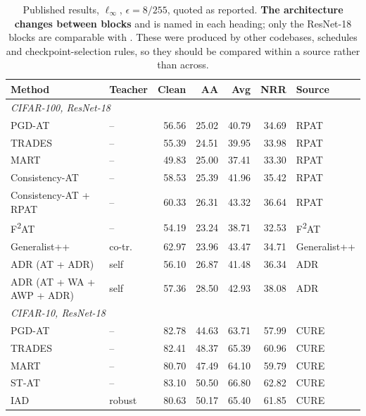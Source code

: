 \documentclass{article} %
\theoremstyle{plain}
\begin{document}
\begin{table}[!htbp]
  \centering \small \setlength{\tabcolsep}{4.5pt}
  \caption{Published results, $\ell_\infty$, $\epsilon = 8/255$, quoted as reported. \textbf{The
  architecture changes between blocks} and is named in each heading; only the ResNet-18 blocks are
  comparable with . These were produced by other codebases, schedules and
  checkpoint-selection rules, so they should be compared within a source rather than across.}
  \label{tab:published}
  \begin{tabular}{llrrrrl}
    \toprule
    Method & Teacher & Clean & AA & Avg & NRR & Source \\
    \midrule
    \multicolumn{7}{l}{\emph{CIFAR-100, ResNet-18}} \\
    PGD-AT                    & --      & 56.56 & 25.02 & 40.79 & 34.69 & RPAT \\
    TRADES                    & --      & 55.39 & 24.51 & 39.95 & 33.98 & RPAT \\
    MART                      & --      & 49.83 & 25.00 & 37.41 & 33.30 & RPAT \\
    Consistency-AT            & --      & 58.53 & 25.39 & 41.96 & 35.42 & RPAT \\
    Consistency-AT + RPAT     & --      & 60.33 & 26.31 & 43.32 & 36.64 & RPAT \\
    F\textsuperscript{2}AT    & --      & 54.19 & 23.24 & 38.71 & 32.53 & F\textsuperscript{2}AT \\
    Generalist++              & co-tr.  & 62.97 & 23.96 & 43.47 & 34.71 & Generalist++ \\
    ADR (AT + ADR)            & self    & 56.10 & 26.87 & 41.48 & 36.34 & ADR \\
    ADR (AT + WA + AWP + ADR) & self    & 57.36 & 28.50 & 42.93 & 38.08 & ADR \\
    \midrule
    \multicolumn{7}{l}{\emph{CIFAR-10, ResNet-18}} \\
    PGD-AT                    & --      & 82.78 & 44.63 & 63.71 & 57.99 & CURE \\
    TRADES                    & --      & 82.41 & 48.37 & 65.39 & 60.96 & CURE \\
    MART                      & --      & 80.70 & 47.49 & 64.10 & 59.79 & CURE \\
    ST-AT                     & --      & 83.10 & 50.50 & 66.80 & 62.82 & CURE \\
    IAD                       & robust  & 80.63 & 50.17 & 65.40 & 61.85 & CURE \\

\end{tabular}
\end{table}
\end{document}
